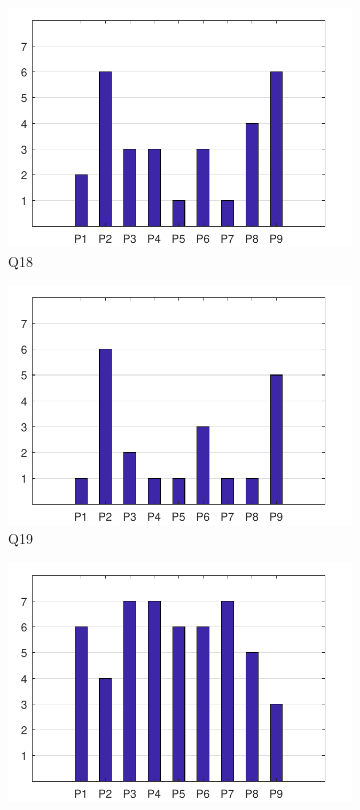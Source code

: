 \documentclass[english, 12pt, a4paper, pdftex, elec, utf8]{aaltothesis}
\begin{document}
\begin{figure}[h!]
\begin{subfigure}[b]{0.49\textwidth}
		\includegraphics[width=\textwidth]{T2_9.pdf}
		\caption*{Q18}
	\end{subfigure}
	\begin{subfigure}[b]{0.49\textwidth}
		\includegraphics[width=\textwidth]{T2_10.pdf}
		\caption*{Q19}
	\end{subfigure}
	\begin{subfigure}[b]{0.49\textwidth}
		\includegraphics[width=\textwidth]{T2_11.pdf}

\end{subfigure}
\end{figure}
\end{document}
